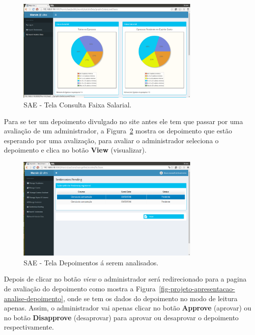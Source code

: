 \begin{figure}[h]
	\centering
	\includegraphics[width=0.8\textwidth]{figuras/projeto/fig-projeto-apresentacao-tela-grafico-salario}
	\caption{SAE - Tela Consulta Faixa Salarial.}
	\label{fig-projeto-apresentacao-tela-grafico-salario}
\end{figure}


\newpage
Para se ter um depoimento divulgado no site antes ele tem que passar por uma avaliação de um administrador, a Figura~\ref{fig-projeto-apresentacao-depoimento-analisar} mostra os depoimento que estão esperando por uma avalização, para avaliar o administrador seleciona o depoimento e clica no botão \textbf{View} (visualizar).
\begin{figure}[h]
	\centering
	\includegraphics[width=0.8\textwidth]{figuras/projeto/fig-projeto-apresentacao-depoimento-analisar}
	\caption{SAE - Tela Depoimentos á serem analisados.}
	\label{fig-projeto-apresentacao-depoimento-analisar}
\end{figure}

Depois de clicar no botão \textit{view} o administrador será redirecionado para a pagina de avaliação do depoimento como mostra a Figura~\ref{fig-projeto-apresentacao-analise-depoimento}, onde se tem os dados do depoimento no modo de leitura apenas. Assim, o administrador vai apenas clicar no botão \textbf{Approve} (aprovar) ou no botão \textbf{Disapprove} (desaprovar) para aprovar ou desaprovar o depoimento respectivamente.

